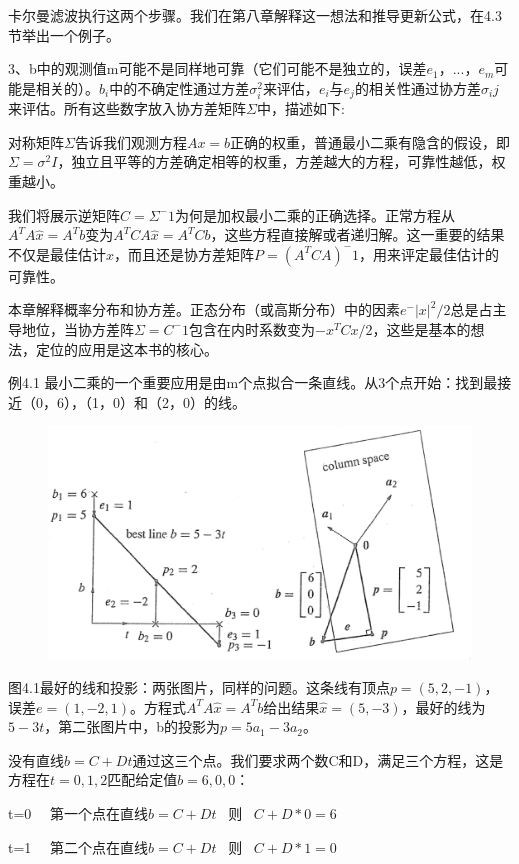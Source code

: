 卡尔曼滤波执行这两个步骤。我们在第八章解释这一想法和推导更新公式，在4.3节举出一个例子。
	
3、b中的观测值m可能不是同样地可靠（它们可能不是独立的，误差$e_1，...，e_m$可能是相关的）。$b_i$中的不确定性通过方差$\sigma^2_i$来评估，$e_i$与$e_j$的相关性通过协方差$\sigma_ij$来评估。所有这些数字放入协方差矩阵$\Sigma$中，描述如下:

对称矩阵$\Sigma$告诉我们观测方程$Ax=b$正确的权重，普通最小二乘有隐含的假设，即$\Sigma=\sigma^2I$，独立且平等的方差确定相等的权重，方差越大的方程，可靠性越低，权重越小。

我们将展示逆矩阵$C=\Sigma^-1$为何是加权最小二乘的正确选择。正常方程从$A^TA\hat{x}=A^Tb$变为$A^TCA\hat{x}=A^TCb$，这些方程直接解或者递归解。这一重要的结果不仅是最佳估计$\hat{x}$，而且还是协方差矩阵$P=(A^TCA)^-1$，用来评定最佳估计的可靠性。
	
本章解释概率分布和协方差。正态分布（或高斯分布）中的因素$e^-|x|^2 /2$总是占主导地位，当协方差阵$\Sigma=C^-1$包含在内时系数变为$-x^TCx/2$，这些是基本的想法，定位的应用是这本书的核心。
	
例4.1  最小二乘的一个重要应用是由m个点拟合一条直线。从3个点开始：找到最接近（0，6），（1，0）和（2，0）的线。

\begin{figure}[h]
	\centering
	\includegraphics[width=0.7\linewidth]{TeX_files/Part02/chapter04/image/4-1}
	\caption[误差=到直线的垂直距离]{}
	\caption{}
	\label{fig:4-1}
\end{figure}

图4.1\;最好的线和投影：两张图片，同样的问题。这条线有顶点$p=(5,2,-1)$，误差$e=(1,-2,1)$。方程式$A^TA\hat{x}=A^Tb$给出结果$\hat{x}=(5,-3)$，最好的线为$5-3t$，第二张图片中，b的投影为$p=5a_1-3a_2$。

没有直线$b=C+Dt$通过这三个点。我们要求两个数C和D，满足三个方程，这是方程在$t = 0,1,2$匹配给定值$b= 6,0,0$：

	t=0   第一个点在直线$b=C+Dt$  则  $C+D*0=6$ 
	
	t=1   第二个点在直线$b=C+Dt$  则  $C+D*1=0$
	
